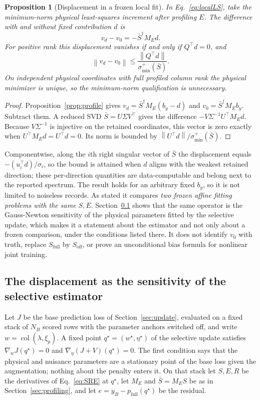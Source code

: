 \documentclass[11pt,a4paper]{article}
\newcommand{\col}{\operatorname{col}}
\newcommand{\norm}[1]{\left\lVert#1\right\rVert}
\newcommand{\full}{\mathrm{full}}
\newcommand{\off}{\mathrm{off}}
\newtheorem{proposition}{Proposition}[section]
\theoremstyle{remark}
\begin{document}
\begin{proposition}[Displacement in a frozen local fit]\label{prop:bias}
In Eq.~\eqref{eq:localLS}, take the minimum-norm physical least-squares increment after profiling $E$. The difference with and without fixed contribution $d$ is
\begin{equation}\label{eq:displacement}
 v_d-v_0=-\bar S^\dagger M_Ed.
\end{equation}
For positive rank this displacement vanishes if and only if $Q^\top d=0$, and
\begin{equation}\label{eq:bound}
 \norm{v_d-v_0}\le
 \frac{\norm{Q^\top d}}{\sigma_{\min}^{+}(\bar S)}.
\end{equation}
On independent physical coordinates with full profiled column rank the physical minimizer is unique, so the minimum-norm qualification is unnecessary.
\end{proposition}
\begin{proof}
Proposition~\ref{prop:profile} gives $v_d=\bar S^\dagger M_E(b_y-d)$ and $v_0=\bar S^\dagger M_Eb_y$. Subtract them. A reduced SVD $\bar S=U\Sigma V^\top$ gives the difference $-V\Sigma^{-1}U^\top M_Ed$. Because $V\Sigma^{-1}$ is injective on the retained coordinates, this vector is zero exactly when $U^\top M_Ed=U^\top d=0$. Its norm is bounded by $\norm{U^\top d}/\sigma_{\min}^{+}(\bar S)$.
\end{proof}
Componentwise, along the $i$th right singular vector of $\bar S$ the displacement equals $-(u_i^\top d)/\sigma_i$, so the bound is attained when $d$ aligns with the weakest retained direction; these per-direction quantities are data-computable and belong next to the reported spectrum. The result holds for an arbitrary fixed $b_y$, so it is not limited to noiseless records. As stated it compares \emph{two frozen affine fitting problems with the same $S,E$}. Section~\ref{sec:estimator} shows that the same operator is the Gauss-Newton sensitivity of the physical parameters fitted by the selective update, which makes it a statement about the estimator and not only about a frozen comparison, under the conditions listed there. It does not identify $v_0$ with truth, replace $S_\full$ by $S_\off$, or prove an unconditional bias formula for nonlinear joint training.


\subsection{The displacement as the sensitivity of the selective estimator}\label{sec:estimator}
Let $J$ be the base prediction loss of Section~\ref{sec:update}, evaluated on a fixed stack of $N_B$ scored rows with the parameter anchors switched off, and write $w=\col(\lambda,\xi_p)$. A fixed point $q^\star=(w^\star,\eta^\star)$ of the selective update satisfies $\nabla_wJ(q^\star)=0$ and $\nabla_\eta(J+V)(q^\star)=0$. The first condition says that the physical and nuisance parameters are a stationary point of the base loss given the augmentation; nothing about the penalty enters it. On that stack let $S,E,R$ be the derivatives of Eq.~\eqref{eq:SRE} at $q^\star$, let $M_E$ and $\bar S=M_ES$ be as in Section~\ref{sec:profiling}, and let $e=y_B-p_\full(q^\star)$ be the residual.
\end{document}
